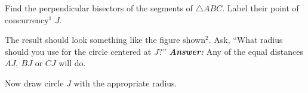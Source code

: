 \documentclass{tufte-handout}
\newcommand{\uv}{\vspace{.1in}}
\begin{document}
\begin{tcolorbox}
\begin{minipage}{0.45\textwidth}
\begin{scriptsize}
\uv
Find the perpendicular bisectors of the segments of $\triangle ABC.$ Label their point of concurrency$^1$ $J.$
\end{scriptsize}
\end{minipage}

 \uv
  \begin{minipage}{0.5\textwidth}
\end{minipage} \hfill
\begin{minipage}{0.45\textwidth}
\begin{scriptsize}

\uv
The result should look something like the figure shown$^2$. Ask, ``What radius should you use for the circle centered at $J$?'' \textbf{\textit{Answer:}} Any of the equal distances $AJ, \ BJ$ or $CJ$ will do.

\uv Now draw circle $J$ with the appropriate radius. 
\end{scriptsize}
\end{minipage}
\end{tcolorbox}
\end{document}
